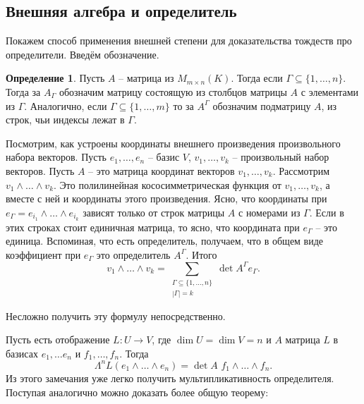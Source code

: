 \documentclass[12pt,a4paper,oneside]{book}
\theoremstyle{definition}
\newtheorem*{defn}{\color{yellow!30!red} Определение}
\def\dfn{\begin{defn}}
\def\edfn{\end{defn}}
\begin{document}
\subsection{Внешняя алгебра и определитель}

Покажем способ применения внешней степени для доказательства тождеств про определители. Введём обозначение.

\dfn Пусть $A$ -- матрица из $M_{m\times n}(K)$. Тогда если $\Gamma \subseteq \{1,\dots,n\}$. Тогда за $A_{\Gamma}$ обозначим матрицу состоящую из столбцов матрицы $A$ с элементами из $\Gamma$. Аналогично, если $\Gamma \subseteq \{1,\dots,m\}$ то за $A^{\Gamma}$ обозначим подматрицу $A$, из строк, чьи индексы лежат в $\Gamma$.
\edfn

Посмотрим, как устроены координаты внешнего произведения произвольного набора векторов. Пусть $e_1,\dots,e_n$ -- базис $V$, $v_1,\dots,v_k$ --  произвольный набор векторов. Пусть $A$ -- это матрица координат векторов $v_1,\dots,v_k$.
Рассмотрим $v_1 \wedge \dots \wedge v_k$. Это полилинейная кососимметрическая функция от $v_1,\dots,v_k$, а вместе с ней и координаты этого произведения. Ясно, что координаты при $e_{\Gamma}=e_{i_1}\wedge\dots\wedge e_{i_k}$ зависят только от строк матрицы $A$ с номерами из $\Gamma$. Если в этих строках стоит единичная матрица, то ясно, что координата при $e_{\Gamma}$ -- это единица. Вспоминая, что есть определитель, получаем, что в общем виде коэффициент при $e_{\Gamma}$ это определитель $A^{\Gamma}$. Итого 
$$v_1 \wedge \dots \wedge v_k= \sum_{\substack{\Gamma \subseteq \{1,\dots,n\}\\ |\Gamma|=k}} \det A^{\Gamma} e_{\Gamma}.$$

Несложно получить эту формулу непосредственно.

Пусть есть отображение $L \colon U \to V$, где $\dim U= \dim V = n$ и $A$ матрица $L$ в базисах $e_1,\dots e_n$ и $f_1,\dots,f_n$. Тогда $$\Lambda^n L(e_1\wedge \dots \wedge e_n) = \det A \,\,f_1 \wedge \dots \wedge f_n.$$
Из этого замечания уже легко получить мультипликативность определителя. Поступая аналогично можно доказать более общую теорему:
\end{document}
